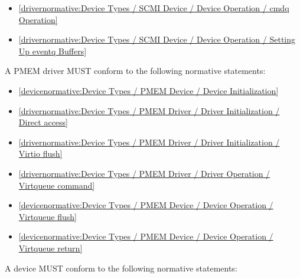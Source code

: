 \begin{itemize}
\item \ref{drivernormative:Device Types / SCMI Device / Device Operation / cmdq Operation}
\item \ref{drivernormative:Device Types / SCMI Device / Device Operation / Setting Up eventq Buffers}
\end{itemize}

\label{sec:Conformance / Driver Conformance / PMEM Driver Conformance}

A PMEM driver MUST conform to the following normative statements:

\begin{itemize}
\item \ref{devicenormative:Device Types / PMEM Device / Device Initialization}
\item \ref{drivernormative:Device Types / PMEM Driver / Driver Initialization / Direct access}
\item \ref{drivernormative:Device Types / PMEM Driver / Driver Initialization / Virtio flush}
\item \ref{drivernormative:Device Types / PMEM Driver / Driver Operation / Virtqueue command}
\item \ref{devicenormative:Device Types / PMEM Device / Device Operation / Virtqueue flush}
\item \ref{devicenormative:Device Types / PMEM Device / Device Operation / Virtqueue return}
\end{itemize}

\label{sec:Conformance / Device Conformance}

A device MUST conform to the following normative statements:

